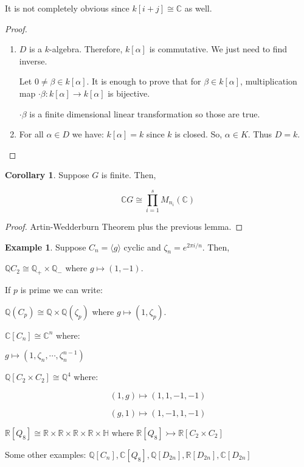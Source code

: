 \documentclass{article}
\theoremstyle{definition}
\newtheorem*{example}{Example}
\newtheorem{corollary}[theorem]{Corollary}
\begin{document}
It is not completely obvious since \(k[i+j] \cong \mathbb{C}\) as well.

\begin{proof}
    \begin{enumerate}[label=\alph*)]
        \item \(D\) is a \(k\)-algebra. Therefore, \(k[\alpha]\) is commutative. We just need to find inverse.
        
        Let \(0 \neq \beta \in k[\alpha]\). It is enough to prove that for \(\beta \in k[\alpha]\), multiplication map \(\cdot\beta : k[\alpha] \to k[\alpha]\) is bijective.

        \(\cdot \beta\) is a finite dimensional linear transformation so those are true.

        \item For all \(\alpha \in D\) we have: \(k[\alpha]=k\) since \(k\) is closed. So, \(\alpha \in K\). Thus \(D = k\). 
    \end{enumerate} 
\end{proof}

\begin{corollary}
    Suppose \(G\) is finite. Then,

    \[
        \mathbb{C} G \cong \prod_{i=1}^s M_{n_i}(\mathbb{C})
    \]
\end{corollary}

\begin{proof}
    Artin-Wedderburn Theorem plus the previous lemma.
\end{proof}

\begin{example}
    Suppose \(C_n = \langle g \rangle \) cyclic and \(\zeta_n = e^{2\pi i / n}\). Then,

    \(\mathbb{Q} C_2 \cong \mathbb{Q}_+ \times \mathbb{Q}_-\) where \(g \mapsto (1,-1)\). 

    If \(p\) is prime we can write:

    \(\mathbb{Q} (C_p) \cong \mathbb{Q} \times \mathbb{Q}(\zeta_p)\) where \(g \mapsto (1,\zeta_p)\). 
    
    \(\mathbb{C} [C_n] \cong \mathbb{C}^n\) where:

    \(g \mapsto (1, \zeta_n, \cdots , \zeta_n^{n-1})\) 

    \(\mathbb{Q} [C_2 \times C_2] \cong \mathbb{Q}^4\) where:

    \[
        (1,g) \mapsto (1,1,-1,-1)
    \]

    \[
        (g,1) \mapsto (1,-1,1,-1)
    \]

    \(\mathbb{R}[Q_8] \cong \mathbb{R} \times \mathbb{R} \times \mathbb{R} \times \mathbb{R} \times \mathbb{H}\) where \(\mathbb{R} [Q_8] \rightarrowtail \mathbb{R} [C_2 \times C_2]\)
    
    Some other examples: \(\mathbb{Q} [C_n], \mathbb{C} [Q_8], \mathbb{Q} [D_{2n}], \mathbb{R} [D_{2n}], \mathbb{C} [D_{2n}]\) 
\end{example}
\end{document}
